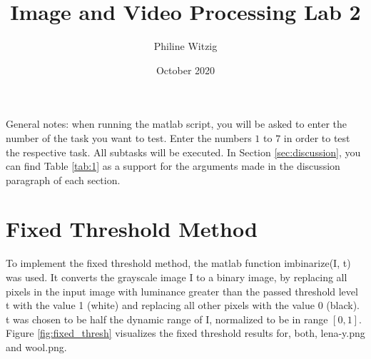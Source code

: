 \documentclass{article}
\title{Image and Video Processing Lab 2}
\author{Philine Witzig}
\date{October 2020}
\begin{document}
\maketitle
General notes: when running the matlab script, you will be asked to enter the number of the task you want to test. Enter the numbers $1$ to $7$ in order to test the respective task. All subtasks will be executed. In Section \ref{sec:discussion}, you can find Table \ref{tab:1} as a support for the arguments made in the discussion paragraph of each section.
\section{Fixed Threshold Method}
To implement the fixed threshold method, the matlab function \textsf{imbinarize(I, t)} was used. It converts the grayscale image \textsf{I} to a binary image, by replacing all pixels in the input image with luminance greater than the passed threshold level \textsf{t} with the value 1 (white) and replacing all other pixels with the value 0 (black). \textsf{t} was chosen to be half the dynamic range of \textsf{I}, normalized to be in range $[0, 1]$. Figure \ref{fig:fixed_thresh} visualizes the fixed threshold results for, both, \textsf{lena-y.png} and \textsf{wool.png}.
\end{document}
